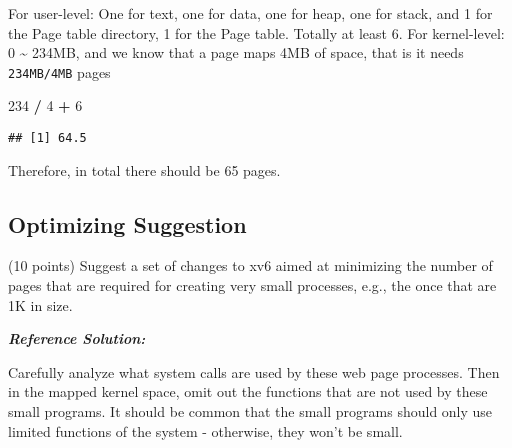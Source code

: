 \documentclass[]{article}
\newenvironment{Shaded}{\begin{snugshade}}{\end{snugshade}}
\newcommand{\DecValTok}[1]{\textcolor[rgb]{0.00,0.00,0.81}{#1}}
\newcommand{\OperatorTok}[1]{\textcolor[rgb]{0.81,0.36,0.00}{\textbf{#1}}}
\newcommand{\StringTok}[1]{\textcolor[rgb]{0.31,0.60,0.02}{#1}}
\begin{document}
For user-level: One for text, one for data, one for heap, one for stack,
and 1 for the Page table directory, 1 for the Page table. Totally at
least 6. For kernel-level: 0 \textasciitilde{} 234MB, and we know that a
page maps 4MB of space, that is it needs \texttt{234MB/4MB} pages

\begin{Shaded}
\begin{Highlighting}[]
\DecValTok{234} \OperatorTok{/}\StringTok{ }\DecValTok{4} \OperatorTok{+}\StringTok{ }\DecValTok{6}
\end{Highlighting}
\end{Shaded}

\begin{verbatim}
## [1] 64.5
\end{verbatim}

Therefore, in total there should be 65 pages.

\hypertarget{optimizing-suggestion}{%
\subsection{Optimizing Suggestion}\label{optimizing-suggestion}}

(10 points) Suggest a set of changes to xv6 aimed at minimizing the
number of pages that are required for creating very small processes,
e.g., the once that are 1K in size.

\textbf{\emph{Reference Solution:}}

Carefully analyze what system calls are used by these web page
processes. Then in the mapped kernel space, omit out the functions that
are not used by these small programs. It should be common that the small
programs should only use limited functions of the system - otherwise,
they won't be small.
\end{document}
